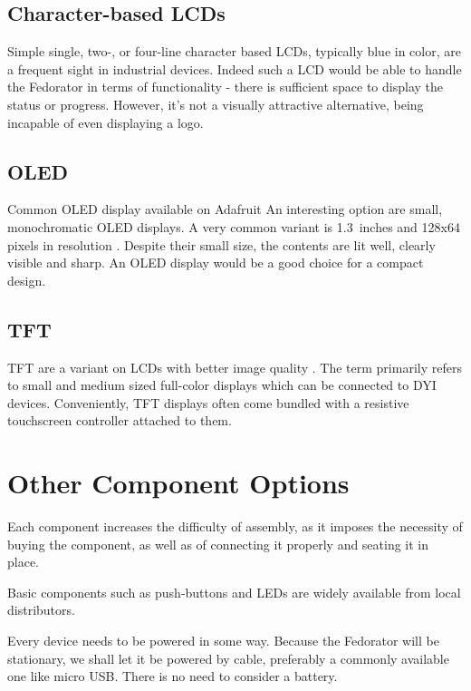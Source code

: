        \subsection{Character-based LCDs}
            Simple single, two-, or four-line character based LCDs, typically blue in color, are a frequent sight in industrial devices.  Indeed such a LCD would be able to handle the Fedorator in terms of functionality - there is sufficient space to display the status or progress.  However, it's not a visually attractive alternative, being incapable of even displaying a logo.
            
            
        \subsection{OLED}
                {Common OLED display available on Adafruit  \cite{adafruit-oled}}
            An interesting option are small, monochromatic OLED displays.  A very common variant is 1.3~inches and 128x64 pixels in resolution \cite{adafruit-oled}.  Despite their small size, the contents are lit well, clearly visible and sharp.  An OLED display would be a good choice for a compact design. 
            
        \subsection{TFT}
            TFT are a variant on LCDs with better image quality \cite{lifewire-what-is-tft-lcd}.  The term primarily refers to small and medium sized full-color displays which can be connected to DYI devices.  Conveniently, TFT displays often come bundled with a resistive touchscreen controller attached to them.
            
    \section{Other Component Options}
        Each component increases the difficulty of assembly, as it imposes the necessity of buying the component, as well as of connecting it properly and seating it in place.
        
        Basic components such as push-buttons and LEDs are widely available from local distributors.
        
        Every device needs to be powered in some way.  Because the Fedorator will be stationary, we shall let it be powered by cable, preferably a commonly available one like micro USB.  There is no need to consider a battery.

